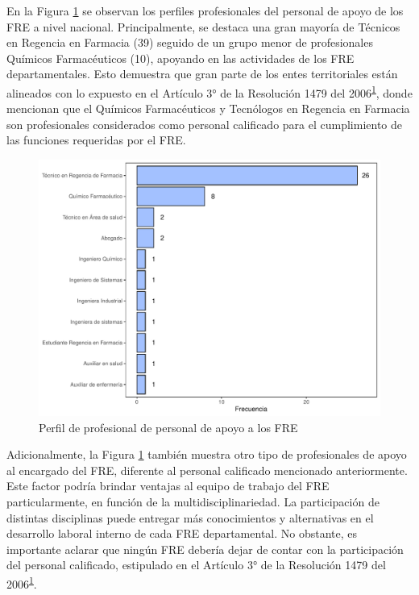 \documentclass[
]{book}
\begin{document}
En la Figura \ref{fig:perfilProfesional2} se observan los perfiles profesionales del personal de apoyo de los FRE a nivel nacional. Principalmente, se destaca una gran mayoría de Técnicos en Regencia en Farmacia (39) seguido de un grupo menor de profesionales Químicos Farmacéuticos (10), apoyando en las actividades de los FRE departamentales. Esto demuestra que gran parte de los entes territoriales están alineados con lo expuesto en el Artículo 3° de la Resolución 1479 del 2006\textsuperscript{\protect\hyperlink{ref-MSPS1479-2006}{1}}, donde mencionan que el Químicos Farmacéuticos y Tecnólogos en Regencia en Farmacia son profesionales considerados como personal calificado para el cumplimiento de las funciones requeridas por el FRE.

\begin{figure}

{\centering \includegraphics[width=0.9\linewidth]{InformeFinal_files/figure-latex/perfilProfesional2-1} 

}

\caption{Perfil de profesional de personal de apoyo a los FRE}\label{fig:perfilProfesional2}
\end{figure}

Adicionalmente, la Figura \ref{fig:perfilProfesional2} también muestra otro tipo de profesionales de apoyo al encargado del FRE, diferente al personal calificado mencionado anteriormente. Este factor podría brindar ventajas al equipo de trabajo del FRE particularmente, en función de la multidisciplinariedad. La participación de distintas disciplinas puede entregar más conocimientos y alternativas en el desarrollo laboral interno de cada FRE departamental. No obstante, es importante aclarar que ningún FRE debería dejar de contar con la participación del personal calificado, estipulado en el Artículo 3° de la Resolución 1479 del 2006\textsuperscript{\protect\hyperlink{ref-MSPS1479-2006}{1}}.
\end{document}
